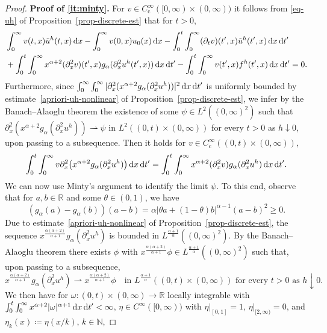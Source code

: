 \documentclass[reqno,12pt]{amsart}
\renewcommand{\d}{\ensuremath{\mathrm{d}}}
\newcommand{\R}{\ensuremath{\mathbb{R}}}
\newcommand{\N}{\ensuremath{\mathbb{N}}}
\renewcommand{\d}{\ensuremath{{\rm d}}}
\numberwithin{equation}{section}
\begin{document}
\begin{proof}
%
\textbf{Proof of \eqref{it:minty}. }
%
For $v \in C^\infty_\mathrm{c}([0,\infty) \times (0,\infty))$ it follows from \eqref{eq-uh} of Proposition~\ref{prop-discrete-est} that for $t > 0$,
%
\begin{align}\nonumber
& \int_0^\infty v(t,x) \tilde u^h(t,x) \, \d x - \int_0^\infty v(0,x) u_0(x) \, \d x - \int_0^t \int_0^\infty (\partial_t v)(t',x) \tilde u^h(t',x) \, \d x \, \d t'
\\
& + \int_0^t \int_0^\infty x^{\alpha+2} (\partial_x^2 v)(t',x) g_\alpha(\partial_x^2 u^h(t',x)) \, \d x \, \d t' - \int_0^t \int_0^\infty v(t',x) f^h(t',x) \, \d x \, \d t' = 0. \label{eq-uh-tested}
\end{align}
%
Furthermore, since $\int_0^\infty \int_0^\infty |\partial_x^2(x^{\alpha+2} g_\alpha(\partial_x^2 u^h))|^2 \, \d x \, \d t'$ is uniformly bounded by estimate~\eqref{apriori-uh-nonlinear} of Proposition~\ref{prop-discrete-est}, we infer by the Banach--Alaoglu theorem the existence of some $\psi \in L^2((0,\infty)^2)$ such that $\partial_x^2(x^{\alpha+2} g_\alpha(\partial_x^2 u^h)) \rightharpoonup \psi$ in $L^2((0,t) \times (0,\infty))$ for every $t > 0$ as $h \downarrow 0$, upon passing to a subsequence. Then it holds for $v \in C_\mathrm{c}^\infty((0,t) \times (0,\infty))$,
%
\[
\int_0^t \int_0^\infty v \partial_x^2\big(x^{\alpha+2} g_\alpha(\partial_x^2 u^h)\big) \, \d x \, \d t' = \int_0^t \int_0^\infty x^{\alpha+2} (\partial_x^2 v) g_\alpha(\partial_x^2 u^h) \, \d x \, \d t'.
\]
%
We can now use Minty's argument to identify the limit $\psi$. To this end, observe that for $a,b \in \R$ and some $\theta \in (0,1)$, we have
%
\[
(g_\alpha(a)-g_\alpha(b)) (a-b) = \alpha |\theta a + (1-\theta) b|^{\alpha-1} (a-b)^2 \ge 0.
\]
%
Due to estimate~\eqref{apriori-uh-nonlinear} of Proposition~\ref{prop-discrete-est},
the sequence $x^{\frac{\alpha(\alpha+2)}{\alpha+1}} g_\alpha(\partial_x^2 u^h)$
is bounded in $L^{\frac{\alpha+1}{\alpha}}((0,\infty)^2)$. By the Banach--Alaoglu theorem there exists $\phi$ with $x^{\frac{\alpha(\alpha+2)}{\alpha+1}} \phi\in L^{\frac{\alpha+1}{\alpha}}((0,\infty)^2)$ such that, upon passing to a subsequence,
%
\[
x^{\frac{\alpha(\alpha+2)}{\alpha+1}} g_\alpha(\partial_x^2 u^h)
\rightharpoonup x^{\frac{\alpha(\alpha+2)}{\alpha+1}} \phi
\quad \text{in } L^{\frac{\alpha+1}{\alpha}}((0,t) \times (0,\infty))
\text{ for every } t > 0 \text{ as } h \downarrow 0.
\]
%
We then have for $\omega \colon (0,t) \times (0,\infty) \to \R$ locally integrable with $\int_0^t \int_0^\infty x^{\alpha+2} |\omega|^{\alpha+1} \, \d x \, \d t' < \infty$, $\eta \in C^\infty([0,\infty))$ with $\eta|_{[0,1]} = 1$, $\eta|_{[2,\infty)} = 0$, and $\eta_k(x) \coloneq \eta(x/k)$, $k \in \N$, 

\end{proof}
\end{document}
